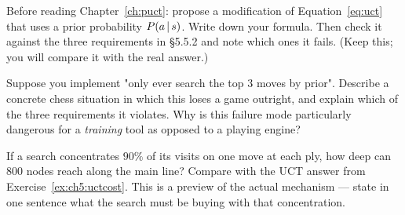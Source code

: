 \begin{exercises}
 Before reading Chapter~\ref{ch:puct}: propose a
modification of Equation~\eqref{eq:uct} that uses a prior probability $P(a\,|\, s)$. Write
down your formula. Then check it against the three requirements in §5.5.2 and note which
ones it fails. (Keep this; you will compare it with the real answer.)

 Suppose you implement "only ever search the top 3 moves
by prior". Describe a concrete chess situation in which this loses a game outright, and
explain which of the three requirements it violates. Why is this failure mode particularly
dangerous for a \emph{training} tool as opposed to a playing engine?

 If a search concentrates $90\%$ of its visits on
one move at each ply, how deep can 800 nodes reach along the main line? Compare with the UCT
answer from Exercise~\ref{ex:ch5:uctcost}. This is a preview of the actual mechanism ---
state in one sentence what the search must be buying with that concentration.

\end{exercises}
